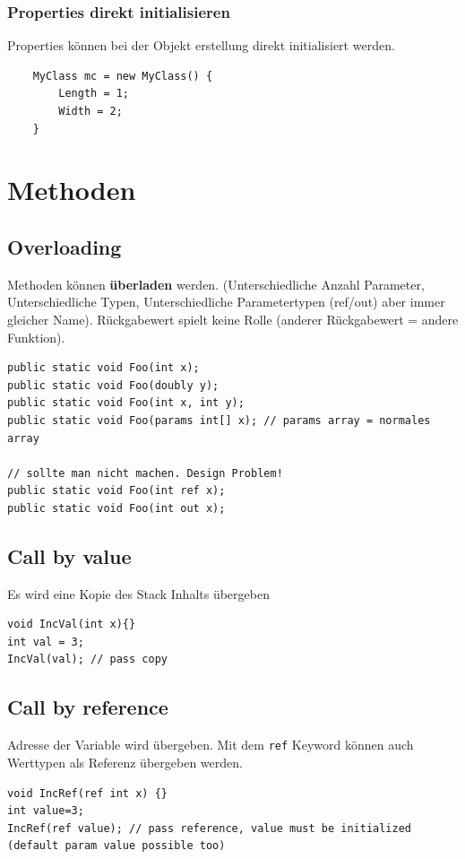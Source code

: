 \documentclass[
a4paper,
oneside,
10pt,
fleqn,
headsepline,
toc=listofnumbered, 
bibliography=totocnumbered]{scrartcl}
\let\stdsection\section
\renewcommand\section{\clearpage\stdsection}
\begin{document}
\subsubsection{Properties direkt initialisieren}
Properties können bei der Objekt erstellung direkt initialisiert werden. 
\begin{lstlisting}
	MyClass mc = new MyClass() {
		Length = 1;
		Width = 2;
	}
\end{lstlisting}



\section{Methoden}
\subsection{Overloading}

Methoden können \textbf{überladen} werden. (Unterschiedliche Anzahl Parameter, Unterschiedliche Typen, Unterschiedliche Parametertypen (ref/out) aber immer gleicher Name). Rückgabewert spielt keine Rolle (anderer Rückgabewert = andere Funktion).
\begin{lstlisting}
public static void Foo(int x);
public static void Foo(doubly y);
public static void Foo(int x, int y);
public static void Foo(params int[] x); // params array = normales array

// sollte man nicht machen. Design Problem!
public static void Foo(int ref x);
public static void Foo(int out x);
\end{lstlisting}

\subsection{Call by value}
Es wird eine Kopie des Stack Inhalts übergeben
\begin{lstlisting}
void IncVal(int x){}
int val = 3; 
IncVal(val); // pass copy
\end{lstlisting}

\subsection{Call by reference}
Adresse der Variable wird übergeben. Mit dem \lstinline|ref| Keyword können auch Werttypen als Referenz übergeben werden.
\begin{lstlisting}
void IncRef(ref int x) {}
int value=3;
IncRef(ref value); // pass reference, value must be initialized (default param value possible too)
\end{lstlisting}
\end{document}

